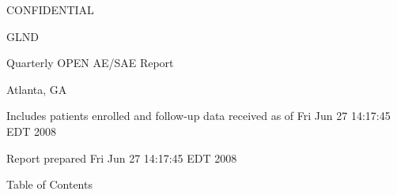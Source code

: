 \documentclass[dvips,10pt]{article}
\begin{document}
\vspace*{1in}
\begin{center}
{\Huge{CONFIDENTIAL}}
\end{center}
\vspace*{0.5in}
\begin{center}
{\Huge{GLND}}
\end{center}
\vspace*{0.25in}
\begin{center}
{\Huge{
Quarterly OPEN AE/SAE Report
}}
\end{center}
\begin{center}
{\Huge{
 
}}
\end{center}
\begin{center}
{\Huge{Atlanta, GA}}
\end{center}
\vspace*{1in}
\begin{center}
\noindent
{\Large{Includes patients enrolled and follow-up data received as of Fri Jun 27 14:17:45 EDT 2008}}
\end{center}
\vspace*{0.5in}
\begin{center}
{\Large{Report prepared  Fri Jun 27 14:17:45 EDT 2008 }}
\end{center}
\clearpage
\vspace*{1in}
\begin{center}
{\Huge{Table of Contents}}
\end{center}
\listoftables
\listoffigures
\clearpage
\end{document}

